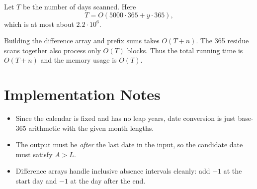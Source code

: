 \documentclass[11pt]{article}
\begin{document}
Let $T$ be the number of days scanned. Here
\[
T = O(5000 \cdot 365 + y \cdot 365),
\]
which is at most about $2.2 \cdot 10^6$.

Building the difference array and prefix sums takes $O(T + n)$. The 365 residue scans together also
process only $O(T)$ blocks. Thus the total running time is $O(T + n)$ and the memory usage is $O(T)$.

\section*{Implementation Notes}

\begin{itemize}[leftmargin=*]
    \item Since the calendar is fixed and has no leap years, date conversion is just base-365 arithmetic with
    the given month lengths.
    \item The output must be \emph{after} the last date in the input, so the candidate date must satisfy
    $A > L$.
    \item Difference arrays handle inclusive absence intervals cleanly: add $+1$ at the start day and $-1$
    at the day after the end.
\end{itemize}
\end{document}
